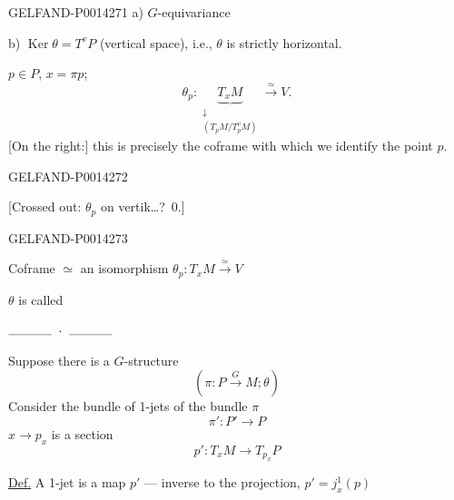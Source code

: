 \begin{GelfandAdjacentEvidence}{GELFAND-P001427}{1}
a) \(G\)-equivariance

b) \(\operatorname{Ker}\theta=T^vP\) (vertical space), i.e.,
\(\theta\) is strictly horizontal.


\(p\in P\), \(x=\pi p\);
\[
\theta_p\colon
\underset{\substack{\downarrow\\ (T_pM/T_p^vM)}}{\underbrace{T_xM}}
\overset{\simeq}{\longrightarrow}V.
\]
[On the right:] this is precisely the coframe with which we identify the point \(p\).
\end{GelfandAdjacentEvidence}
\begin{GelfandAdjacentEvidence}{GELFAND-P001427}{2}


[Crossed out: \(\theta_p\) on vertik\ldots{}? \(\,0\).]
\end{GelfandAdjacentEvidence}
\begin{GelfandAdjacentEvidence}{GELFAND-P001427}{3}


Coframe \(\simeq\) an isomorphism
\(\theta_p\colon T_xM\overset{\simeq}{\longrightarrow}V\)

\(\theta\) is called 

\begin{center}
\(\rule{1.2cm}{.3pt}\ \cdot\ \rule{1.2cm}{.3pt}\)
\end{center}

Suppose there is a \(G\)-structure
\[
(\pi\colon P\overset{G}{\longrightarrow}M;\theta)
\]
Consider the bundle of 1-jets of the bundle \(\pi\)
\[
\pi'\colon P'\to P
\]
\(x\to p_x\) is a section
\[
p'\colon T_xM\to T_{p_x}P
\]

\uline{Def.} A 1-jet is a map \(p'\) — inverse to the projection, \(p'=j_x^1(p)\)

\end{GelfandAdjacentEvidence}
